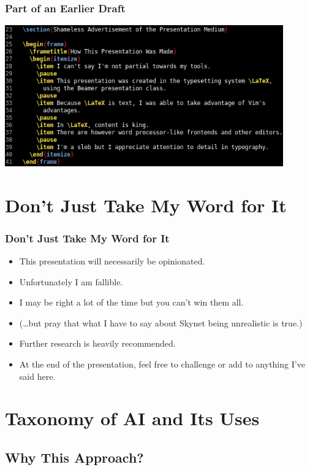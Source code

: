 \documentclass[10pt]{beamer}
\begin{document}
  \begin{frame}
    \frametitle{Part of an Earlier Draft}
    \begin{center}
      \includegraphics[width=0.9\textwidth]{latex-section-and-frame.png}
    \end{center}
  \end{frame}

  \section{Don't Just Take My Word for It}

  \begin{frame}
    \frametitle{Don't Just Take My Word for It}

    \begin{itemize}
      \item This presentation will necessarily be opinionated.
      \pause
      \item Unfortunately I am fallible.
      \pause
      \item I may be right a lot of the time but you can't win them all.
      \pause
      \item (\ldots{}but pray that what I have to say about Skynet being
        unrealistic is true.)
      \pause
      \item Further research is heavily recommended.
      \pause
      \item At the end of the presentation, feel free to challenge or add to
        anything I've said here.
    \end{itemize}
  \end{frame}

  \section{Taxonomy of AI and Its Uses}

  \subsection{Why This Approach?}
\end{document}
